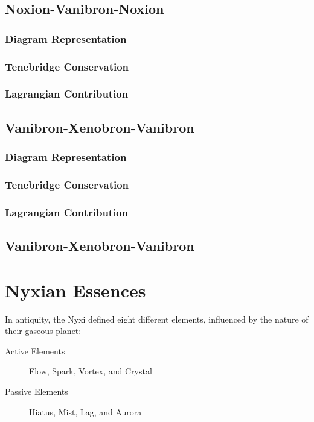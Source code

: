 \subsection{Noxion-Vanibron-Noxion}
\subsubsection{Diagram Representation}
\subsubsection{Tenebridge Conservation}
\subsubsection{Lagrangian Contribution}

\subsection{Vanibron-Xenobron-Vanibron}
\subsubsection{Diagram Representation}
\subsubsection{Tenebridge Conservation}
\subsubsection{Lagrangian Contribution}

\subsection{Vanibron-Xenobron-Vanibron}

\section{Nyxian Essences}

\begin{remark}
  In antiquity, the Nyxi defined eight different elements, influenced by the nature of their gaseous planet:
  \begin{description}
    \item[Active Elements] Flow, Spark, Vortex, and Crystal
    \item[Passive Elements] Hiatus, Mist, Lag, and Aurora
  \end{description}
\end{remark}
